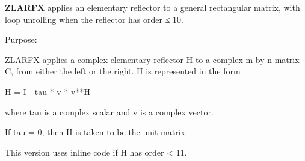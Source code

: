 {\bfseries Z\+L\+A\+R\+F\+X} applies an elementary reflector to a general rectangular matrix, with loop unrolling when the reflector has order ≤ 10. 

 \begin{DoxyParagraph}{Purpose\+: }
\begin{DoxyVerb} ZLARFX applies a complex elementary reflector H to a complex m by n
 matrix C, from either the left or the right. H is represented in the
 form

       H = I - tau * v * v**H

 where tau is a complex scalar and v is a complex vector.

 If tau = 0, then H is taken to be the unit matrix

 This version uses inline code if H has order < 11.\end{DoxyVerb}
 
\end{DoxyParagraph}

